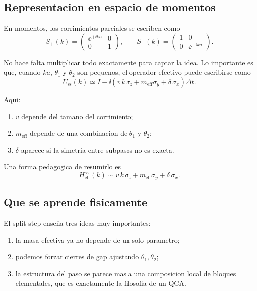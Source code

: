 \subsection{Representacion en espacio de momentos}

En momentos, los corrimientos parciales se escriben como
\begin{equation}
S_+(k)=
\begin{pmatrix}
\ee^{+\ii ka} & 0\\
0 & 1
\end{pmatrix},
\qquad
S_-(k)=
\begin{pmatrix}
1 & 0\\
0 & \ee^{-\ii ka}
\end{pmatrix}.
\end{equation}

No hace falta multiplicar todo exactamente para captar la idea. Lo importante es que, cuando \(ka\), \(\theta_1\) y \(\theta_2\) son pequenos, el operador efectivo puede escribirse como
\begin{equation}
U_{\text{ss}}(k)\simeq I-\ii\left(v\,k\,\sigma_z + m_{\text{eff}}\sigma_y + \delta\,\sigma_x\right)\Delta t.
\label{c04:eq:split-qual}
\end{equation}

Aqui:

\begin{enumerate}[leftmargin=*]
  \item \(v\) depende del tamano del corrimiento;
  \item \(m_{\text{eff}}\) depende de una combinacion de \(\theta_1\) y \(\theta_2\);
  \item \(\delta\) aparece si la simetria entre subpasos no es exacta.
\end{enumerate}

Una forma pedagogica de resumirlo es
\begin{equation}
H_{\text{eff}}^{\text{ss}}(k)\sim v\,k\,\sigma_z + m_{\text{eff}}\sigma_y + \delta\,\sigma_x.
\label{c04:eq:heff-ss}
\end{equation}

\subsection{Que se aprende fisicamente}

El split-step ense\~na tres ideas muy importantes:

\begin{enumerate}[leftmargin=*]
  \item la masa efectiva ya no depende de un solo parametro;
  \item podemos forzar cierres de gap ajustando \(\theta_1,\theta_2\);
  \item la estructura del paso se parece mas a una composicion local de bloques elementales, que es exactamente la filosofia de un QCA.
\end{enumerate}


